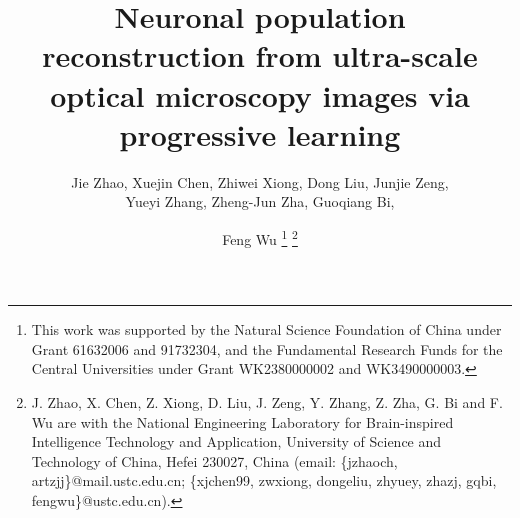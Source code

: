 \documentclass[journal]{IEEEtran}
\begin{document}
%
\title{Neuronal population reconstruction from ultra-scale optical microscopy images via progressive learning}
% 
%
%
\author{Jie Zhao, Xuejin Chen, Zhiwei Xiong, Dong Liu, Junjie Zeng, \\Yueyi Zhang, Zheng-Jun Zha, Guoqiang Bi, \and Feng Wu
\thanks{This work was supported by the Natural Science Foundation of China under Grant 61632006 and 91732304, and the Fundamental Research Funds for the Central Universities under Grant WK2380000002 and WK3490000003.}
\thanks{J. Zhao, X. Chen, Z. Xiong, D. Liu, J. Zeng, Y. Zhang, Z. Zha, G. Bi and F. Wu are with the National Engineering Laboratory for Brain-inspired Intelligence Technology and Application, University of Science and Technology of China, Hefei 230027, China (email: \{jzhaoch, artzjj\}@mail.ustc.edu.cn; \{xjchen99, zwxiong, dongeliu, zhyuey, zhazj, gqbi, fengwu\}@ustc.edu.cn).}
}
\end{document}

